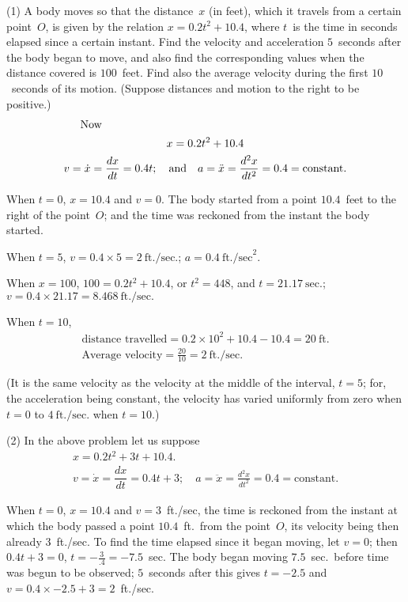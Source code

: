 \documentclass[12pt]{book}[2005/09/16]
\newcommand\Subsection[1]{%
  \medskip\pagebreak[1]\par\textit{#1}\pagebreak[0]\par%
}
\newcommand{\Examples}[1]{%
  \ifthenelse{\equal{#1}{.}}{%
    \Subsection{\textit{Examples.}}%
  }{%
    \Subsection{\textit{#1}}%
  }
}
\newcommand{\DPPageSep}[2]{\Pagelabel{#2}}
\newcommand{\Pagelabel}[1]
  {\phantomsection\label{#1}}
\newcommand{\DPtypo}[2]{#2}%
\begin{document}
\Examples.
(1) A body moves so that the distance~$x$ (in feet),
which it travels from a certain point~$O$, is given by
the relation $x = 0.2t^2 + 10.4$, where $t$~is the time in
seconds elapsed since a certain instant. Find the
velocity and acceleration $5$~seconds after the body
began to move, and also find the corresponding values
when the distance covered is $100$~feet. Find also
the average velocity during the first $10$~seconds of
its motion. (Suppose distances and motion to the
right to be positive.)
\begin{gather*}
\intertext{\rlap{\indent Now}}
x = 0.2t^2 + 10.4 \\
v = \dot{x}  = \frac{dx}{dt} = 0.4t;\quad\text{and}\quad
a = \ddot{x} = \frac{d^2x}{dt^2} = 0.4 = \text{constant.}
\end{gather*}

When $t = 0$, $x = 10.4$ and $v = 0$. The body started
from a point $10.4$~feet to the right of the point~$O$;
and the time was reckoned from the instant the
body started.

When $t = 5$, $v = 0.4 × 5 = 2~\text{ft./sec.}$; $a = 0.4~\text{ft./sec}^2$.

When $x = 100$, $100 = 0.2t^2 + 10.4$, or $t^2 = 448$,
and $t = 21.17~\text{sec.}$; $v = 0.4 × 21.17 = 8.468~\text{ft./sec.}$

When $t = 10$,
\begin{gather*}
\text{distance travelled} = 0.2 × 10^2 + 10.4 - 10.4 = 20~\text{ft.} \\
\text{Average velocity} = \tfrac{20}{10} = 2~\text{ft./sec.}
\end{gather*}

(It is the same velocity as the velocity at the middle
of the interval, $t = 5$; for, the acceleration being constant,
the velocity has varied uniformly from zero
when $t = 0$ to $4~\text{ft./sec.}$ when $t = 10$.)
\DPPageSep{073.png}{61}%

(2) In the above problem let us suppose
\begin{gather*}
x = 0.2t^2 + 3t + 10.4.\\
v = \dot{x} = \dfrac{dx}{dt} = 0.4t + 3;\quad a = \ddot{x} = \frac{d^2x}{dt^2} = 0.4 = \text{constant}.
\end{gather*}

When $t = 0$, $x = 10.4$ and $v = 3$~ft./sec, the time is
reckoned from the instant at which the body passed a
point $10.4$~ft.\ from the point~$O$, its velocity being then
already $3$~ft./sec. To find the time elapsed since it began
moving, let $v = 0$; then $0.4t + 3 = 0$, $t= -\frac{3}{\DPtypo{4}{.4}}
= -7.5$~sec.
The body began moving $7.5$~sec.\ before time was
begun to be observed; $5$~seconds after this gives
$t = -2.5$ and $v = 0.4 × -2.5 + 3 = 2$~ft./sec.
\end{document}
